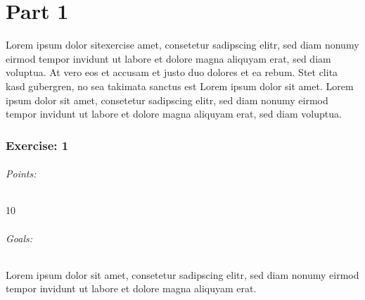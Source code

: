 




\part*{Part 1}
Lorem ipsum dolor sitexercise amet, consetetur sadipscing elitr, sed diam nonumy eirmod tempor invidunt ut labore et dolore magna aliquyam erat, sed diam voluptua. At vero eos et accusam et justo duo dolores et ea rebum. Stet clita kasd gubergren, no sea takimata sanctus est Lorem ipsum dolor sit amet. Lorem ipsum dolor sit amet, consetetur sadipscing elitr, sed diam nonumy eirmod tempor invidunt ut labore et dolore magna aliquyam erat, sed diam voluptua.

\section{Exercise: 1}
\paragraph{Points:} 10
\paragraph{Goals:}
Lorem ipsum dolor sit amet, consetetur sadipscing elitr, sed diam nonumy eirmod tempor invidunt ut labore et dolore magna aliquyam erat.




